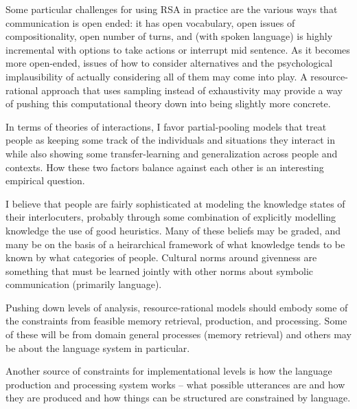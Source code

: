 \documentclass[]{article}
\begin{document}

Some particular challenges for using RSA in practice are the various ways that communication is open ended: it has open vocabulary, open issues of compositionality, open number of turns, and (with spoken language) is highly incremental with options to take actions or interrupt mid sentence. As it becomes more open-ended, issues of how to consider alternatives and the psychological implausibility of actually considering all of them may come into play. A resource-rational approach that uses sampling instead of exhaustivity may provide a way of pushing this computational theory down into being slightly more concrete. 

In terms of theories of interactions, I favor partial-pooling models that treat people as keeping some track of the individuals and situations they interact in while also showing some transfer-learning and generalization across people and contexts. How these two factors balance against each other is an interesting empirical question. 

I believe that people are fairly sophisticated at modeling the knowledge states of their interlocuters, probably through some combination of explicitly modelling knowledge the use of good heuristics. Many of these beliefs may be graded, and many be on the basis of a heirarchical framework of what knowledge tends to be known by what categories of people.  Cultural norms around givenness are something that must be learned jointly with other norms about symbolic communication (primarily language). 

Pushing down levels of analysis, resource-rational models should embody some of the constraints from feasible memory retrieval, production, and processing. Some of these will be from domain general processes (memory retrieval) and others may be about the language system in particular. 


Another source of constraints for implementational levels is how the language production and processing system works -- what possible utterances are and how they are produced and how things can be structured are constrained by language. 
\end{document}
